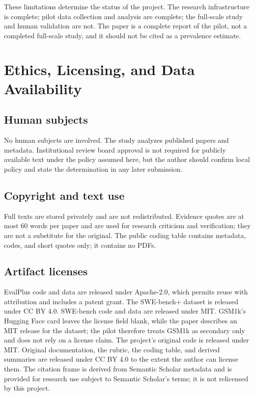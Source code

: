 \documentclass[11pt,a4paper]{article}
\begin{document}
These limitations determine the status of the project. The research infrastructure is complete; pilot data collection and analysis are complete; the full-scale study and human validation are not. The paper is a complete report of the pilot, not a completed full-scale study, and it should not be cited as a prevalence estimate.

\section{Ethics, Licensing, and Data Availability}

\subsection{Human subjects}

No human subjects are involved. The study analyzes published papers and metadata. Institutional review board approval is not required for publicly available text under the policy assumed here, but the author should confirm local policy and state the determination in any later submission.

\subsection{Copyright and text use}

Full texts are stored privately and are not redistributed. Evidence quotes are at most 60 words per paper and are used for research criticism and verification; they are not a substitute for the original. The public coding table contains metadata, codes, and short quotes only; it contains no PDFs.

\subsection{Artifact licenses}

EvalPlus code and data are released under Apache-2.0, which permits reuse with attribution and includes a patent grant. The SWE-bench+ dataset is released under CC BY 4.0. SWE-bench code and data are released under MIT. GSM1k's Hugging Face card leaves the license field blank, while the paper describes an MIT release for the dataset; the pilot therefore treats GSM1k as secondary only and does not rely on a license claim. The project's original code is released under MIT. Original documentation, the rubric, the coding table, and derived summaries are released under CC BY 4.0 to the extent the author can license them. The citation frame is derived from Semantic Scholar metadata and is provided for research use subject to Semantic Scholar's terms; it is not relicensed by this project.
\end{document}
